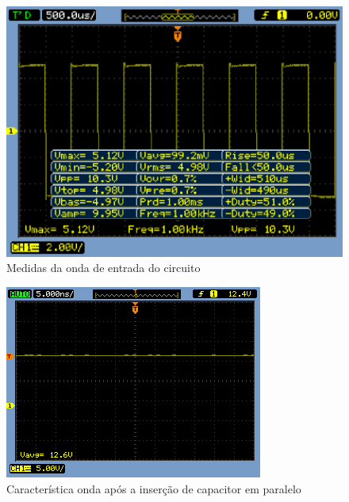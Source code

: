 \documentclass[a4paper]{article} %
\begin{document}
\begin{figure}[h!]
\begin{centering}
\includegraphics[scale=0.7]{Imagens/3.4duplicador_tensao/Vinmedidas} \caption{Medidas da onda de entrada do circuito \label{fig:q4-vindata}}
\par\end{centering}
\end{figure}


\newpage
\begin{figure}[h!]
\begin{centering}
\includegraphics[scale=0.7]{Imagens/3.3.4capacitor_paralelo/3cao1} \caption{Característica onda após a inserção de capacitor em paralelo \label{fig:Fig-45}}
\par\end{centering}
\end{figure}
\end{document}
